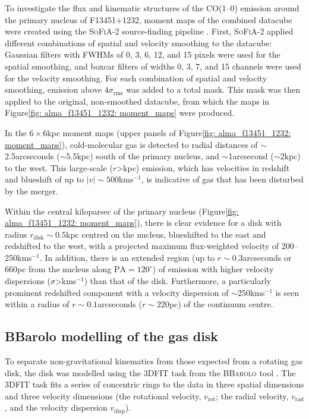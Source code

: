 To investigate the flux and kinematic structures of the CO(1--0) emission around the primary nucleus of F13451+1232, moment maps of the combined datacube were created using the \textsc{SoFiA-2} source-finding pipeline \citep{Serra2015, Serra2021}. First, \textsc{SoFiA-2} applied different combinations of spatial and velocity smoothing to the datacube: Gaussian filters with FWHMs of 0, 3, 6, 12, and 15 pixels were used for the spatial smoothing, and boxcar filters of widths 0, 3, 7, and 15 channels were used for the velocity smoothing. For each combination of spatial and velocity smoothing, emission above $4\sigma_\mathrm{rms}$ was added to a total mask. This mask was then applied to the original, non-smoothed datacube, from which the maps in Figure\;\ref{fig: alma_f13451_1232: moment_maps} were produced. 

In the $6\times6$\;kpc moment maps (upper panels of Figure\;\ref{fig: alma_f13451_1232: moment_maps}), cold-molecular gas is detected to radial distances of $\sim$2.5\;arcseconds ($\sim$5.5\;kpc) south of the primary nucleus, and $\sim$1\;arcsecond ($\sim$2\;kpc) to the west. This large-scale ($r$\;\textgreater{}\;kpc) emission, which has velocities in redshift and blueshift of up to $|v|\sim500$\;km\;s$^{-1}$, is indicative of gas that has been disturbed by the merger.

Within the central kiloparsec of the primary nucleus (Figure\;\ref{fig: alma_f13451_1232: moment_maps}), there is clear evidence for a disk with radius $r_\mathrm{disk}\sim0.5$\;kpc centred on the nucleus, blueshifted to the east and redshifted to the west, with a projected maximum flux-weighted velocity of 200--250\;km\;s$^{-1}$. In addition, there is an extended region (up to $r\sim0.3$\;arcseconds or 660\;pc from the nucleus along $\mathrm{PA}=120^\circ$) of emission with higher velocity dispersions ($\sigma$\;\textgreater{}\;km\;s$^{-1}$) than that of the disk. Furthermore, a particularly prominent redshifted component with a velocity dispersion of $\sim$250\;km\;s$^{-1}$ is seen within a radius of $r\sim0.1$\;arcseconds ($r\sim220$\;pc) of the continuum centre.


\subsection{BBarolo modelling of the gas disk}
\label{section: alma_f13451_1232: analysis_and_results: disk}


To separate non-gravitational kinematics from those expected from a rotating gas disk, the disk was modelled using the \textsc{3DFIT} task from the \textsc{BBarolo} tool \citep{DiTeodoro2015}. The \textsc{3DFIT} task fits a series of concentric rings to the data in three spatial dimensions and three velocity dimensions (the rotational velocity, $v_\mathrm{rot}$; the radial velocity, $v_\mathrm{rad}$, and the velocity dispersion $v_\mathrm{disp}$).

